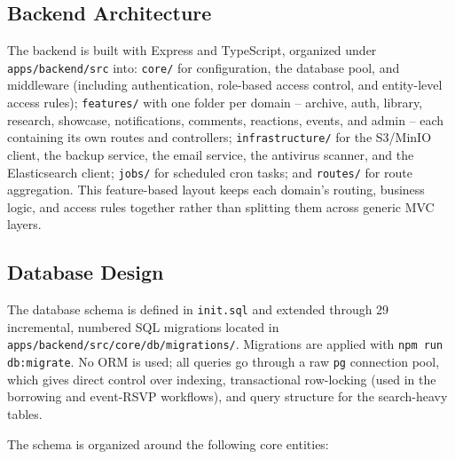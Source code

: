 \documentclass[12pt]{article}
\begin{document}
\subsection{Backend Architecture}
The backend is built with Express and TypeScript, organized under \texttt{apps/backend/src} into: \texttt{core/} for configuration, the database pool, and middleware (including authentication, role-based access control, and entity-level access rules); \texttt{features/} with one folder per domain -- archive, auth, library, research, showcase, notifications, comments, reactions, events, and admin -- each containing its own routes and controllers; \texttt{infrastructure/} for the S3/MinIO client, the backup service, the email service, the antivirus scanner, and the Elasticsearch client; \texttt{jobs/} for scheduled cron tasks; and \texttt{routes/} for route aggregation. This feature-based layout keeps each domain's routing, business logic, and access rules together rather than splitting them across generic MVC layers.

\subsection{Database Design}
The database schema is defined in \texttt{init.sql} and extended through 29 incremental, numbered SQL migrations located in \texttt{apps/backend/src/core/db/migrations/}. Migrations are applied with \texttt{npm run db:migrate}. No ORM is used; all queries go through a raw \texttt{pg} connection pool, which gives direct control over indexing, transactional row-locking (used in the borrowing and event-RSVP workflows), and query structure for the search-heavy tables.

The schema is organized around the following core entities:
\end{document}
